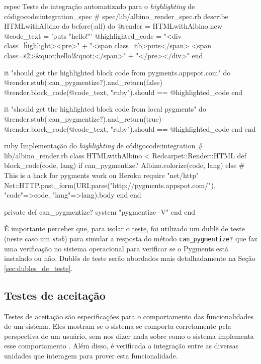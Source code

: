 \begin{mycode}{rspec}%
{Teste de integração automatizado para o \textit{highlighting} de código}{code:integration_spec}
# spec/lib/albino_render_spec.rb
describe HTMLwithAlbino do
  before(:all) do
    @render = HTMLwithAlbino.new
    @code_text = 'puts "hello!"'
    @highlighted_code =
      "<div class=\"highlight\"><pre>" +
        "<span class=\"nb\">puts</span> <span class=\"s2\">&quot;hello!&quot;</span>\n" +
      "</pre>\n</div>\n"
  end

  it "should get the highlighted block code from pygments.appspot.com" do
    @render.stub(:can_pygmentize?).and_return(false)
    @render.block_code(@code_text, "ruby").should == @highlighted_code
  end

  it "should get the highlighted block code from local pygments" do
    @render.stub(:can_pygmentize?).and_return(true)
    @render.block_code(@code_text, "ruby").should == @highlighted_code
  end
end
\end{mycode}

\begin{mycode}{ruby}%
{Implementação do \textit{highlighting} de código}{code:integration}
# lib/albino_render.rb
class HTMLwithAlbino < Redcarpet::Render::HTML
  def block_code(code, lang)
    if can_pygmentize?
      Albino.colorize(code, lang)
    else
      # This is a hack for pygments work on Heroku
      require "net/http"
      Net::HTTP.post_form(URI.parse("http://pygments.appspot.com/"),
                          {"code"=>code, "lang"=>lang}).body
    end
  end

  private
  def can_pygmentize?
    system "pygmentize -V"
  end
end
\end{mycode}

É importante perceber que, para isolar o \hyperref[code:integration_spec]{teste}, foi utilizado um dublê de teste (neste caso um \textit{stub}) para simular a resposta do método \texttt{can\_pygmentize?} que faz uma verificação no sistema operacional para verificar se o Pygments está instalado ou não. Dublês de teste serão abordados mais detalhadamente na Seção \ref{sec:dubles_de_teste}.


\subsection{Testes de aceitação}
\label{ssub:testes_de_aceitacao}

Testes de aceitação são especificações para o comportamento das funcionalidades de um sistema. Eles mostram se o sistema se comporta corretamente pela perspectiva de um usuário, sem nos dizer nada sobre como o sistema implementa esse comportamento \cite{TestDrivenKoskela}. Além disso, é verificada a integração entre as diversas unidades que interagem para prover esta funcionalidade.

